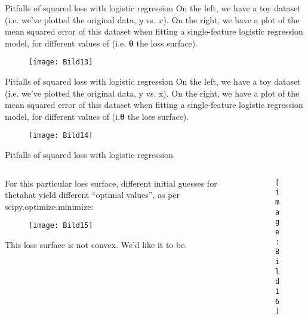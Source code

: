 \documentclass[aspectratio=169]{../latex_main/tntbeamer}  %
\begin{document}
	
	\begin{frame}{Pitfalls of squared loss with logistic regression}
	    On the left, we have a toy dataset (i.e. we’ve plotted the original data, $y$ vs. $x$). On the right, we have a plot of the mean squared error of this dataset when fitting a single-feature logistic regression model, for different values of (i.e. $\bm{\theta}$ the loss surface).
	    \begin{figure}
	        \centering
	        \texttt{[image: Bild13]}
	    \end{figure}
	\end{frame}
	
	
	\begin{frame}{Pitfalls of squared loss with logistic regression}
	    On the left, we have a toy dataset (i.e. we’ve plotted the original data, y vs. x). On the right, we have a plot of the mean squared error of this dataset when fitting a single-feature logistic regression model, for different values of (i.$\bm{\theta}$ the loss surface).
	    \begin{figure}
	        \centering
	        \texttt{[image: Bild14]}
	    \end{figure}
	\end{frame}
	
	
	\begin{frame}{Pitfalls of squared loss with logistic regression}
	    \begin{columns}
	        \begin{column}{.5\textwidth}
	                For this particular loss surface, different initial guesses for thetahat yield different “optimal values”, as per scipy.optimize.minimize:
	                \begin{figure}
	                    \centering
	                    \texttt{[image: Bild15]}
	                \end{figure}
	                This loss surface is not convex. We’d like it to be.
	        \end{column}
	        
	        \begin{column}{.5\textwidth}
	                \begin{figure}
	                    \centering
	                    \texttt{[image: Bild16]}
	                \end{figure}
	        \end{column}
	    \end{columns}
	\end{frame}
	
\end{document}
